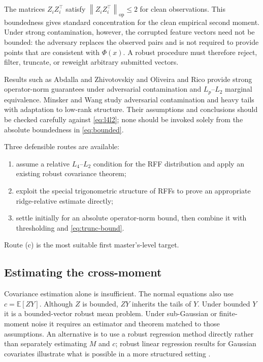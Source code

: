 \documentclass[11pt]{article}
\newcommand{\E}{\mathbb{E}}
\newcommand{\op}{\mathrm{op}}
\newcommand{\norm}[1]{\left\lVert #1\right\rVert}
\begin{document}
The matrices $Z_iZ_i^\top$ satisfy
$\norm{Z_iZ_i^\top}_\op\leq2$ for clean observations.  This boundedness gives
standard concentration for the clean empirical second moment.  Under strong
contamination, however, the corrupted feature vectors need not be bounded: the
adversary replaces the observed pairs and is not required to provide points
that are consistent with $\Phi(x)$.  A robust procedure must therefore reject,
filter, truncate, or reweight arbitrary submitted vectors.

Results such as Abdalla and Zhivotovskiy \cite{abdalla2022} and Oliveira and
Rico \cite{oliveira2022} provide strong operator-norm guarantees under
adversarial contamination and $L_p$--$L_2$ marginal equivalence.  Minsker and
Wang \cite{minsker2022} study adversarial contamination and heavy tails with
adaptation to low-rank structure.  Their assumptions and conclusions should be
checked carefully against \eqref{eq:l4l2}; none should be invoked solely from
the absolute boundedness in \eqref{eq:bounded}.

Three defensible routes are available:
\begin{enumerate}[label=(\alph*)]
 \item assume a relative $L_4$--$L_2$ condition for the RFF distribution and
       apply an existing robust covariance theorem;
 \item exploit the special trigonometric structure of RFFs to prove an
       appropriate ridge-relative estimate directly;
 \item settle initially for an absolute operator-norm bound, then combine it
       with thresholding and \cref{eq:trunc-bound}.
\end{enumerate}
Route (c) is the most suitable first master's-level target.

\subsection{Estimating the cross-moment}

Covariance estimation alone is insufficient.  The normal equations also use
$c=\E[ZY]$.  Although $Z$ is bounded, $ZY$ inherits the tails of $Y$.  Under
bounded $Y$ it is a bounded-vector robust mean problem.  Under sub-Gaussian or
finite-moment noise it requires an estimator and theorem matched to those
assumptions.  An alternative is to use a robust regression method directly
rather than separately estimating $M$ and $c$; robust linear regression results
for Gaussian covariates illustrate what is possible in a more structured
setting \cite{diakonikolas2023}.
\end{document}
